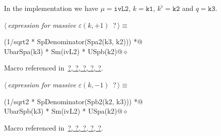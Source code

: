 \documentclass[a4paper,12pt]{amsart}
\renewcommand{\NWtarget}[2]{\hypertarget{#1}{#2}}
\renewcommand{\NWlink}[2]{\hyperlink{#1}{#2}}
\renewcommand{\NWtxtMacroRefIn}{Macro referenced in}
\renewcommand{\NWsep}{${\diamond}$}
\begin{document}
In the implementation we have $\mu=\mathtt{ivL2}$, $k=\mathtt{k1}$,
$k^\flat=\mathtt{k2}$ and $q=\mathtt{k3}$.
\begin{flushleft} \small
\begin{minipage}{\linewidth}\label{scrap24}\raggedright\small
\NWtarget{nuweb?}{} $\langle\,${\it expression for massive $\varepsilon(k, +1)$}\nobreak\ {\footnotesize {?}}$\,\rangle\equiv$
\vspace{-1ex}
\begin{list}{}{} \item
\mbox{}\verb@(1/sqrt2 * SpDenominator(Spa2(k3, k2))) *@\\
\mbox{}\verb@   UbarSpa(k3) * Sm(ivL2) * USpb(k2)@{\NWsep}
\end{list}
\vspace{-1.5ex}
\footnotesize
\begin{list}{}{\setlength{\itemsep}{-\parsep}\setlength{\itemindent}{-\leftmargin}}
\item \NWtxtMacroRefIn\ \NWlink{nuweb?}{?}\NWlink{nuweb?}{, ?}\NWlink{nuweb?}{, ?}\NWlink{nuweb?}{, ?}\NWlink{nuweb?}{, ?}.

\item{}
\end{list}
\end{minipage}\vspace{4ex}
\end{flushleft}
\begin{flushleft} \small
\begin{minipage}{\linewidth}\label{scrap25}\raggedright\small
\NWtarget{nuweb?}{} $\langle\,${\it expression for massive $\varepsilon(k, -1)$}\nobreak\ {\footnotesize {?}}$\,\rangle\equiv$
\vspace{-1ex}
\begin{list}{}{} \item
\mbox{}\verb@(1/sqrt2 * SpDenominator(Spb2(k2, k3))) *@\\
\mbox{}\verb@   UbarSpb(k3) * Sm(ivL2) * USpa(k2)@{\NWsep}
\end{list}
\vspace{-1.5ex}
\footnotesize
\begin{list}{}{\setlength{\itemsep}{-\parsep}\setlength{\itemindent}{-\leftmargin}}
\item \NWtxtMacroRefIn\ \NWlink{nuweb?}{?}\NWlink{nuweb?}{, ?}\NWlink{nuweb?}{, ?}\NWlink{nuweb?}{, ?}\NWlink{nuweb?}{, ?}.

\item{}
\end{list}
\end{minipage}\vspace{4ex}
\end{flushleft}
\end{document}
